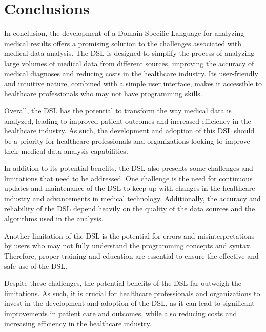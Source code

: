 \chapter*{Conclusions}

In conclusion, the development of a Domain-Specific Language for analyzing medical results offers a promising solution to the challenges associated with medical data analysis. The DSL is designed to simplify the process of analyzing large volumes of medical data from different sources, improving the accuracy of medical diagnoses and reducing costs in the healthcare industry. Its user-friendly and intuitive nature, combined with a simple user interface, makes it accessible to healthcare professionals who may not have programming skills. \par
Overall, the DSL has the potential to transform the way medical data is analyzed, leading to improved patient outcomes and increased efficiency in the healthcare industry. As such, the development and adoption of this DSL should be a priority for healthcare professionals and organizations looking to improve their medical data analysis capabilities. \par

In addition to its potential benefits, the DSL also presents some challenges and limitations that need to be addressed. One challenge is the need for continuous updates and maintenance of the DSL to keep up with changes in the healthcare industry and advancements in medical technology. Additionally, the accuracy and reliability of the DSL depend heavily on the quality of the data sources and the algorithms used in the analysis. \par

Another limitation of the DSL is the potential for errors and misinterpretations by users who may not fully understand the programming concepts and syntax. Therefore, proper training and education are essential to ensure the effective and safe use of the DSL. \par

Despite these challenges, the potential benefits of the DSL far outweigh the limitations. As such, it is crucial for healthcare professionals and organizations to invest in the development and adoption of the DSL, as it can lead to significant improvements in patient care and outcomes, while also reducing costs and increasing efficiency in the healthcare industry.
